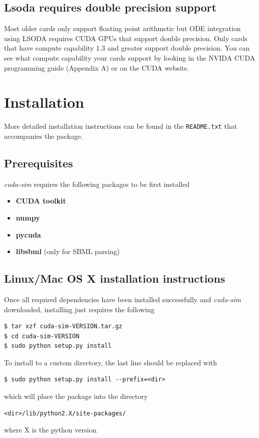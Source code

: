 \documentclass [11pt, a4paper, openany, twoside=off] {article}
\begin{document}
\subsection{Lsoda requires double precision support}
Most older cards only support floating point arithmetic but ODE integration using LSODA requires CUDA GPUs that support double precision. Only cards that have compute capability 1.3 and greater support double precision. You can see what compute capability your cards support by looking in the NVIDA CUDA programming guide (Appendix A) or on the CUDA website.

\newpage
\section{Installation}
More detailed installation instructions can be found in the \verb$README.txt$ that accompanies the package.

\subsection{Prerequisites}
{\it cuda-sim} requires the following packages to be first installed
\begin{itemize}
\item \textbf{CUDA toolkit}
\item \textbf{numpy}
\item \textbf{pycuda}
\item \textbf{libsbml} (only for SBML parsing)
\end{itemize}

\subsection{Linux/Mac OS X installation instructions}
Once all required dependencies have been installed successfully and {\em cuda-sim} downloaded, installing just requires the following
\begin{verbatim}
$ tar xzf cuda-sim-VERSION.tar.gz
$ cd cuda-sim-VERSION
$ sudo python setup.py install 
\end{verbatim}
To install to a custom directory, the last line should be replaced with
\begin{verbatim}
$ sudo python setup.py install --prefix=<dir>
\end{verbatim}
which will place the package into the directory
\begin{verbatim}
<dir>/lib/python2.X/site-packages/
\end{verbatim}
where X is the python version.
     
\end{document}

